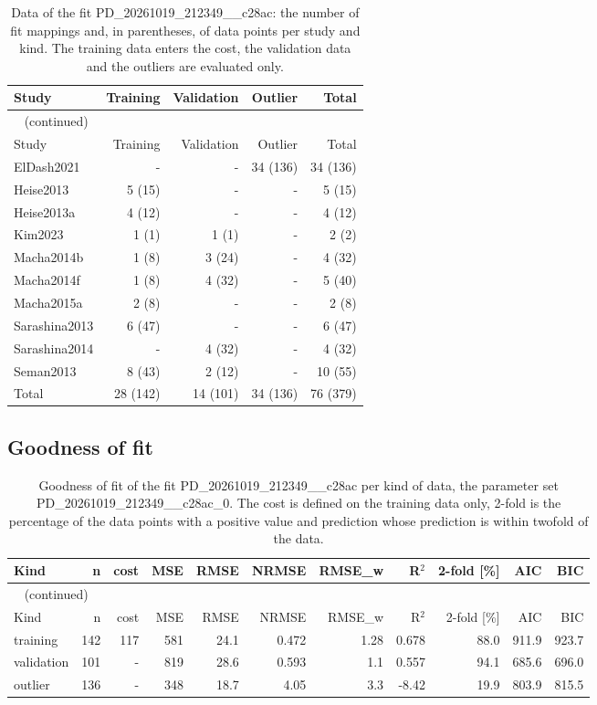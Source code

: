 \documentclass{article}
\begin{document}
\begin{longtable}{lrrrr}
\caption{Data of the fit PD\_20261019\_212349\_\_c28ac: the number of fit mappings and, in parentheses, of data points per study and kind. The training data enters the cost, the validation data and the outliers are evaluated only.}\label{tab:data:PD_20261019_212349__c28ac} \\
\toprule
Study & Training & Validation & Outlier & Total \\
\midrule
\endfirsthead
\multicolumn{5}{l}{\small\tablename~\thetable{} (continued)} \\
\toprule
Study & Training & Validation & Outlier & Total \\
\midrule
\endhead
\bottomrule
\endlastfoot
ElDash2021 & - & - & 34 (136) & 34 (136) \\
Heise2013 & 5 (15) & - & - & 5 (15) \\
Heise2013a & 4 (12) & - & - & 4 (12) \\
Kim2023 & 1 (1) & 1 (1) & - & 2 (2) \\
Macha2014b & 1 (8) & 3 (24) & - & 4 (32) \\
Macha2014f & 1 (8) & 4 (32) & - & 5 (40) \\
Macha2015a & 2 (8) & - & - & 2 (8) \\
Sarashina2013 & 6 (47) & - & - & 6 (47) \\
Sarashina2014 & - & 4 (32) & - & 4 (32) \\
Seman2013 & 8 (43) & 2 (12) & - & 10 (55) \\
Total & 28 (142) & 14 (101) & 34 (136) & 76 (379) \\
\end{longtable}

\subsection{Goodness of fit}

\begin{longtable}{lrrrrrrrrrr}
\caption{Goodness of fit of the fit PD\_20261019\_212349\_\_c28ac per kind of data, the parameter set PD\_20261019\_212349\_\_c28ac\_0. The cost is defined on the training data only, 2-fold is the percentage of the data points with a positive value and prediction whose prediction is within twofold of the data.}\label{tab:metrics:PD_20261019_212349__c28ac} \\
\toprule
Kind & n & cost & MSE & RMSE & NRMSE & RMSE\_w & R\ensuremath{^{2}} & 2-fold [\%] & AIC & BIC \\
\midrule
\endfirsthead
\multicolumn{11}{l}{\small\tablename~\thetable{} (continued)} \\
\toprule
Kind & n & cost & MSE & RMSE & NRMSE & RMSE\_w & R\ensuremath{^{2}} & 2-fold [\%] & AIC & BIC \\
\midrule
\endhead
\bottomrule
\endlastfoot
training & 142 & 117 & 581 & 24.1 & 0.472 & 1.28 & 0.678 & 88.0 & 911.9 & 923.7 \\
validation & 101 & - & 819 & 28.6 & 0.593 & 1.1 & 0.557 & 94.1 & 685.6 & 696.0 \\
outlier & 136 & - & 348 & 18.7 & 4.05 & 3.3 & -8.42 & 19.9 & 803.9 & 815.5 \\
\end{longtable}
\end{document}
